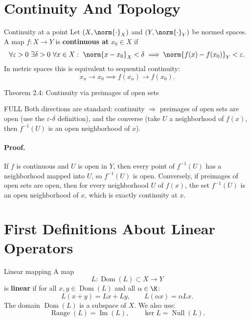 \documentclass[header={Lecture 1 Exam Study Notes}]{study-note}
\begin{document}
\section{Continuity And Topology}

\begin{defbox}{Continuity at a point}
Let $(X,\norm{\cdot}_X)$ and $(Y,\norm{\cdot}_Y)$ be normed spaces. A map $f:X\to Y$ is \textbf{continuous at} $x_0\in X$ if
\[
\forall \varepsilon>0\ \exists \delta>0\ \forall x\in X:\
\norm{x-x_0}_X<\delta \implies \norm{f(x)-f(x_0)}_Y<\varepsilon.
\]
In metric spaces this is equivalent to sequential continuity:
\[
x_n\to x_0 \implies f(x_n)\to f(x_0).
\]
\end{defbox}

\begin{thmbox}{Theorem 2.4: Continuity via preimages of open sets}
\thmContinuityPreimages
\end{thmbox}

\begin{prooflevelbox}{FULL}
Both directions are standard: continuity $\Rightarrow$ preimages of open sets are open (use the $\varepsilon$-$\delta$ definition), and the converse (take $U$ a neighborhood of $f(x)$, then $f^{-1}(U)$ is an open neighborhood of $x$).
\end{prooflevelbox}

\paragraph{Proof.}
If $f$ is continuous and $U$ is open in $Y$, then every point of $f^{-1}(U)$ has a neighborhood mapped into $U$, so $f^{-1}(U)$ is open. Conversely, if preimages of open sets are open, then for every neighborhood $U$ of $f(x)$, the set $f^{-1}(U)$ is an open neighborhood of $x$, which is exactly continuity at $x$.

\section{First Definitions About Linear Operators}

\begin{defbox}{Linear mapping}
A map
\[
L:\operatorname{Dom}(L)\subset X\to Y
\]
is \textbf{linear} if for all $x,y\in \operatorname{Dom}(L)$ and all $\alpha\in\K$:
\[
L(x+y)=Lx+Ly,
\qquad
L(\alpha x)=\alpha Lx.
\]
The domain $\operatorname{Dom}(L)$ is a subspace of $X$. We also use:
\[
\operatorname{Range}(L)=\operatorname{Im}(L),
\qquad
\ker L=\operatorname{Null}(L).
\]
\end{defbox}
\end{document}
